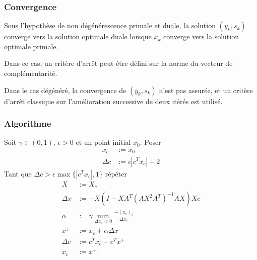 \documentclass[t,usepdftitle=false]{beamer}
\begin{document}
\begin{frame}
	\frametitle{Convergence}
	
	Sous l'hypothèse de non dégénérescence primale et duale, la solution $(y_k, s_k)$ converge vers la solution optimale duale lorsque $x_k$ converge vers la solution optimale primale.
	
	\mbox{}
	
	Dans ce cas, un critère d'arrêt peut être défini sur la norme
	du vecteur de complémentarité.
	
	\mbox{}
	
	Dans le cas dégénéré, la convergence de $(y_k, s_k)$ n'est pas assurée, et un critère d'arrêt classique sur l'amélioration successive de deux itérés est utilisé.
	
\end{frame}

\begin{frame}
	\frametitle{Algorithme}
	
	Soit $\gamma \in (0,1)$, $\epsilon > 0$ et un point initial $x_0$.
	Poser
	\begin{align*}
		x_c &:= x_0 \\
		\Delta c &:= \epsilon|c^Tx_c|+2
	\end{align*}
	Tant que $\Delta c > \epsilon\max\{|c^Tx_c|,1\}$ répéter
	\begin{align*}
		X &:= X_c \\
		\Delta x &:= -X(I - XA^T(AX^2A^T)^{-1}AX)Xc \\
		\alpha &:= \gamma \min_{\Delta x_i < 0} \frac{-(x_c)_i}{\Delta x_i} \\
		x^+ &:= x_c + \alpha \Delta x \\
		\Delta c &:= c^Tx_c - c^Tx^+ \\
		x_c &:= x^+.
	\end{align*}
	
\end{frame}
\end{document}
